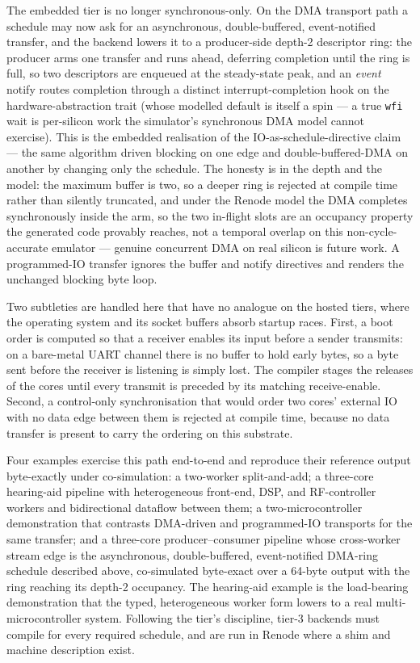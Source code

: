 The embedded tier is no longer synchronous-only. On the DMA transport path a
schedule may now ask for an asynchronous, double-buffered, event-notified transfer,
and the backend lowers it to a producer-side depth-2 descriptor ring: the producer
arms one transfer and runs ahead, deferring completion until the ring is full, so two
descriptors are enqueued at the steady-state peak, and an \emph{event} notify routes
completion through a distinct interrupt-completion hook on the
hardware-abstraction trait (whose modelled default is itself a spin
--- a true \texttt{wfi} wait is per-silicon work the simulator's
synchronous DMA model cannot exercise). This is the embedded
realisation of the IO-as-schedule-directive claim --- the same algorithm driven
blocking on one edge and double-buffered-DMA on another by changing only the schedule.
The honesty is in the depth and the model: the maximum buffer is two, so a deeper ring
is rejected at compile time rather than silently truncated, and under the Renode model
the DMA completes synchronously inside the arm, so the two in-flight slots are an
occupancy property the generated code provably reaches, not a temporal overlap on this
non-cycle-accurate emulator --- genuine concurrent DMA on real silicon is future work.
A programmed-IO transfer ignores the buffer and notify directives and renders the
unchanged blocking byte loop.



Two subtleties are handled here that have no analogue on the
hosted tiers, where the operating system and its socket buffers absorb startup
races. First, a boot order is computed so that a receiver enables its input before
a sender transmits: on a bare-metal UART channel there is no buffer to hold early
bytes, so a byte sent before the receiver is listening is simply lost. The
compiler stages the releases of the cores until every transmit is preceded by its
matching receive-enable. Second, a control-only synchronisation that would order two cores'
external IO with no data edge between them is rejected at compile time, because no
data transfer is present to carry the ordering on this substrate.

Four examples exercise this path end-to-end and reproduce their reference output
byte-exactly under co-simulation: a two-worker split-and-add; a three-core
hearing-aid pipeline with heterogeneous front-end, DSP, and RF-controller workers
and bidirectional dataflow between them; a two-microcontroller demonstration
that contrasts DMA-driven and programmed-IO transports for the same transfer; and a
three-core producer--consumer pipeline whose cross-worker stream edge is the
asynchronous, double-buffered, event-notified DMA-ring schedule described above,
co-simulated byte-exact over a 64-byte output with the ring reaching its depth-2
occupancy. The
hearing-aid example is the load-bearing demonstration that the typed,
heterogeneous worker form lowers to a real multi-microcontroller system. Following the tier's discipline, tier-3 backends
must compile for every required schedule, and are run in Renode where a shim and
machine description exist.

